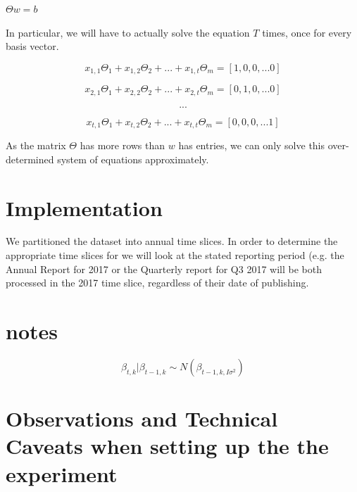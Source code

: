 \documentclass[12pt,journal,letterpaper,oneside,onecolumn]{IEEEtran}
\begin{document}
$\Theta w = b$

In particular, we will have to actually solve the equation $T$ times, once for every basis vector.

$$x_{1,1} \Theta_1 + x_{1,2} \Theta_2 + ... + x_{1,t} \Theta_m = [1,0,0, ... 0] $$

$$x_{2,1} \Theta_1 + x_{2,2} \Theta_2 + ... + x_{2,t} \Theta_m = [0,1,0, ... 0] $$

$$ ... $$

$$x_{t,1} \Theta_1 + x_{t,2} \Theta_2 + ... + x_{t,t} \Theta_m = [0,0,0, ... 1] $$


As the matrix $\Theta$ has more rows than $w$ has entries, we can only solve this over-determined system of equations approximately.


\section{Implementation}

We partitioned the dataset into annual time slices. In order to determine the appropriate time slices for we will look at the stated reporting period (e.g. the Annual Report for 2017 or the Quarterly report for Q3 2017 will be both processed in the 2017 time slice, regardless of their date of publishing.








\section{notes}

$$\beta_{t,k} | \beta_{t-1, k} \sim N(\beta_{t-1,k, I \sigma^2})$$


\section{Observations and Technical Caveats when setting up the the experiment}
\end{document}
